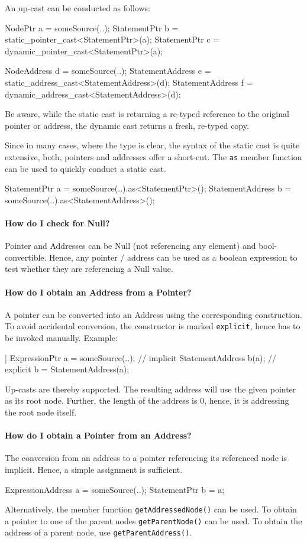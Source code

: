 An up-cast can be conducted as follows:
\begin{insCode}
	NodePtr a = someSource(..);
	StatementPtr b = static_pointer_cast<StatementPtr>(a);
	StatementPtr c = dynamic_pointer_cast<StatementPtr>(a);

	NodeAddress d = someSource(..);
	StatementAddress e = static_address_cast<StatementAddress>(d);
	StatementAddress f = dynamic_address_cast<StatementAddress>(d);
\end{insCode}

Be aware, while the static cast is returning a re-typed reference to the
original pointer or address, the dynamic cast returns a fresh, re-typed copy.

Since in many cases, where the type is clear, the syntax of the static cast is
quite extensive, both, pointers and addresses offer a short-cut. The \texttt{as}
member function can be used to quickly conduct a static cast.

\begin{insCode}
	StatementPtr a = someSource(..).as<StatementPtr>();
	StatementAddress b = someSource(..).as<StatementAddress>();
\end{insCode}

\paragraph{How do I check for Null?}
Pointer and Addresses can be Null (not referencing any element) and
bool-convertible. Hence, any pointer / address can be used as a boolean
expression to test whether they are referencing a Null value.

\paragraph{How do I obtain an Address from a Pointer?}
A pointer can be converted into an Address using the corresponding construction.
To avoid accidental conversion, the constructor is marked \lstinline|explicit|,
hence has to be invoked manually. Example:
\begin{insCode}]
	ExpressionPtr a = someSource(..);
	// implicit
	StatementAddress b(a);
	// explicit
	b = StatementAddress(a);
\end{insCode}
Up-casts are thereby supported. The resulting address will use the given pointer
as its root node. Further, the length of the address is 0, hence, it is
addressing the root node itself.

\paragraph{How do I obtain a Pointer from an Address?}
The conversion from an address to a pointer referencing its referenced node is
implicit. Hence, a simple assignment is sufficient.
\begin{insCode}
	ExpressionAddress a = someSource(..);
	StatementPtr b = a;
\end{insCode}
Alternatively, the member function \lstinline|getAddressedNode()| can be used.
To obtain a pointer to one of the parent nodes \lstinline|getParentNode()| can
be used. To obtain the address of a parent node, use
\lstinline|getParentAddress()|.

